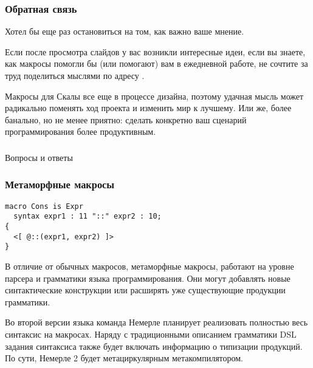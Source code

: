 \documentclass{beamer}
\begin{document}
\begin{frame}[t]
\frametitle{Обратная связь}

Хотел бы еще раз остановиться на том, как важно ваше мнение.

Если после просмотра слайдов у вас возникли интересные идеи, если вы знаете, как макросы помогли бы (или помогают) вам в ежедневной работе, не сочтите за труд поделиться мыслями по адресу .

Макросы для Скалы все еще в процессе дизайна, поэтому удачная мысль может радикально поменять ход проекта и изменить мир к лучшему. Или же, более банально, но не менее приятно: сделать конкретно ваш сценарий программирования более продуктивным.
\end{frame}

\begin{frame}[c, fragile]
\frametitle{}

\centering
{\Large Вопросы и ответы}\\

\centering
{}

\end{frame}

\begin{frame}[t, fragile]
\frametitle{Метаморфные макросы}

\begin{lstlisting}[language=nemerle]
macro Cons is Expr 
  syntax expr1 : 11 "::" expr2 : 10; 
{ 
  <[ @::(expr1, expr2) ]> 
}
\end{lstlisting}

В отличие от обычных макросов, метаморфные макросы, работают на уровне парсера и грамматики языка программирования. Они могут добавлять новые синтактические конструкции или расширять уже существующие продукции грамматики.

Во второй версии языка команда Немерле планирует реализовать полностью весь синтаксис на макросах. Наряду с традиционными описанием грамматики DSL задания синтаксиса также будет включать информацию о типизации продукций. По сути, Немерле 2 будет метациркулярным метакомпилятором.

\end{frame}
\end{document}
